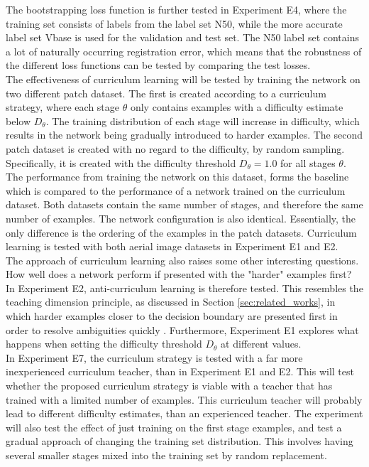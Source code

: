 The bootstrapping loss function is further tested in Experiment E4, where the training set consists of labels from the label set N50, while the more accurate label set Vbase is used for the validation and test set. The N50 label set contains a lot of naturally occurring registration error, which means that the robustness of the different loss functions can be tested by comparing the test losses.\\

The effectiveness of curriculum learning will be tested by training the network on two different patch dataset. The first is created according to a curriculum strategy, where each stage $\theta$ only contains examples with a difficulty estimate below $D_\theta$. The training distribution of each stage will increase in difficulty, which results in the network being gradually introduced to harder examples. The second patch dataset is created with no regard to the difficulty, by random sampling. Specifically, it is created with the difficulty threshold $D_\theta =1.0$ for all stages $\theta$. The performance from training the network on this dataset, forms the baseline which is compared to the performance of a network trained on the curriculum dataset. Both datasets contain the same number of stages, and therefore the same number of examples. The network configuration is also identical. Essentially, the only difference is the ordering of the examples in the patch datasets. Curriculum learning is tested with both aerial image datasets in Experiment E1 and E2.\\

The approach of curriculum learning also raises some other interesting questions. How well does a network perform if presented with the "harder" examples first? In Experiment E2, anti-curriculum learning is therefore tested. This resembles the teaching dimension principle, as discussed in Section \ref{sec:related_works}, in which harder examples closer to the decision boundary are presented first in order to resolve ambiguities quickly . Furthermore, Experiment E1 explores what happens when setting the difficulty threshold $D_\theta$ at different values.\\

In Experiment E7, the curriculum strategy is tested with a far more inexperienced curriculum teacher, than in Experiment E1 and E2. This will test whether the proposed curriculum strategy is viable with a teacher that has trained with a limited number of examples. This curriculum teacher will probably lead to different difficulty estimates, than an experienced teacher. The experiment will also test the effect of just training on the first stage examples, and test a gradual approach of changing the training set distribution. This involves having several smaller stages mixed into the training set by random replacement.\\

